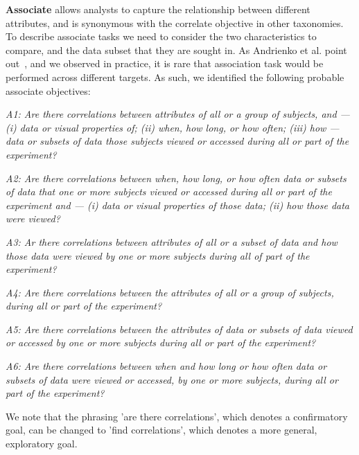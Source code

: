 \vspace{2mm}
\noindent\textbf{Associate} allows analysts to capture the relationship between different attributes, and is synonymous with the correlate objective in other taxonomies. To describe associate tasks we need to consider the two characteristics to compare, and the data subset that they are sought in. As Andrienko et al. point out~\cite{And03}, and we observed in practice, it is rare that association task would be performed across different targets. As such, we identified the following probable associate objectives:

\vspace{2mm}
\hangindent=3mm\textit{A1: Are there correlations between attributes of all or a group of subjects, and --- (i) data or visual properties of; (ii) when, how long, or how often; (iii) how --- data or subsets of data those subjects viewed or accessed during all or part of the experiment?} 

\vspace{2mm}
\hangindent=3mm\textit{A2: Are there correlations between when, how long, or how often data or subsets of data that one or more subjects viewed or accessed during all or part of the experiment and --- (i) data or visual properties of those data; (ii) how those data were viewed?}

\vspace{2mm}
\hangindent=3mm\textit{A3: Ar there correlations between attributes of all or a subset of data and how those data were viewed by one or more subjects during all of part of the experiment?}

\vspace{2mm}
\hangindent=3mm\textit{A4: Are there correlations between the attributes of all or a group of subjects, during all or part of the experiment?}

\vspace{2mm}
\hangindent=3mm\textit{A5: Are there correlations between the attributes of data or subsets of data viewed or accessed by one or more subjects during all or part of the experiment?}

\vspace{2mm}
\hangindent=3mm\textit{A6: Are there correlations between when and how long or how often data or subsets of data were viewed or accessed, by one or more subjects, during all or part of the experiment?}

\vspace{2mm}
We note that the phrasing 'are there correlations', which denotes a confirmatory goal, can be changed to 'find correlations', which denotes a more general, exploratory goal.

